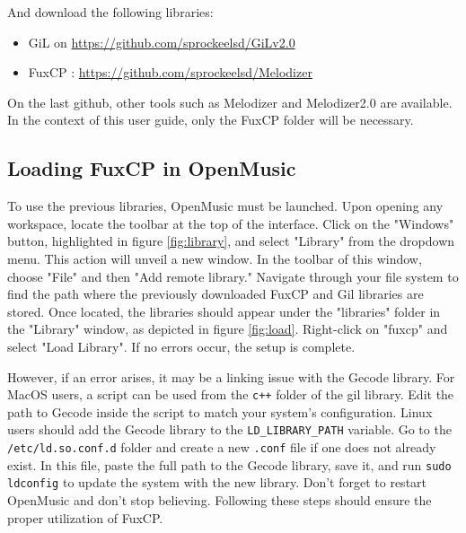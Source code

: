 And download the following libraries:
\begin{itemize}
    \item GiL on \url{https://github.com/sprockeelsd/GiLv2.0}
    \item FuxCP : \url{https://github.com/sprockeelsd/Melodizer}
\end{itemize}
On the last github, other tools such as Melodizer and Melodizer2.0 are available. In the context of this user guide, only the FuxCP folder will be necessary.

\subsection{Loading FuxCP in OpenMusic}
To use the previous libraries, OpenMusic must be launched. Upon opening any workspace, locate the toolbar at the top of the interface. Click on the "Windows" button, highlighted in figure \ref{fig:library}, and select "Library" from the dropdown menu. This action will unveil a new window. In the toolbar of this window, choose "File" and then "Add remote library." Navigate through your file system to find the path where the previously downloaded FuxCP and Gil libraries are stored. Once located, the libraries should appear under the "libraries" folder in the "Library" window, as depicted in figure \ref{fig:load}. Right-click on "fuxcp" and select "Load Library". If no errors occur, the setup is complete.

However, if an error arises, it may be a linking issue with the Gecode library. For MacOS users, a script can be used from the \texttt{c++} folder of the gil library. Edit the path to Gecode inside the script to match your system's configuration. Linux users should add the Gecode library to the \texttt{LD\_LIBRARY\_PATH} variable. Go to the \texttt{/etc/ld.so.conf.d} folder and create a new \texttt{.conf} file if one does not already exist. In this file, paste the full path to the Gecode library, save it, and run \texttt{sudo ldconfig} to update the system with the new library. Don't forget to restart OpenMusic and don't stop believing. Following these steps should ensure the proper utilization of FuxCP.

